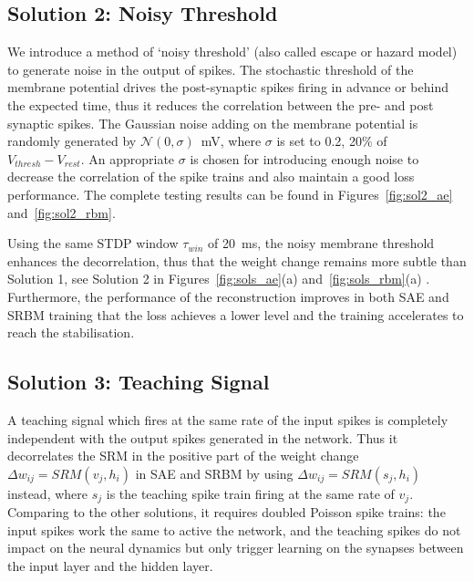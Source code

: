 \subsection{Solution 2: Noisy Threshold}
We introduce a method of `noisy threshold' (also called escape or hazard model)~\cite{gerstner2002spiking} to generate noise in the output of spikes.
The stochastic threshold of the membrane potential drives the post-synaptic spikes firing in advance or behind the expected time, thus it reduces the correlation between the pre- and post synaptic spikes.
The Gaussian noise adding on the membrane potential is randomly generated by $\mathcal{N}(0, \sigma)$~mV, where $\sigma$ is set to 0.2, 20\% of $V_{thresh} - V_{rest}.$
An appropriate $\sigma$ is chosen for introducing enough noise to decrease the correlation of the spike trains and also maintain a good loss performance.
The complete testing results can be found in Figures~\ref{fig:sol2_ae} and~\ref{fig:sol2_rbm}.

Using the same STDP window $\tau_{win}$ of 20~ms, the noisy membrane threshold enhances the decorrelation, thus that the weight change remains more subtle than Solution 1, see Solution 2 in Figures~\ref{fig:sols_ae}(a) and~\ref{fig:sols_rbm}(a) .
Furthermore, the performance of the reconstruction improves in both SAE and SRBM training that the loss achieves a lower level and the training accelerates to reach the stabilisation. %


\subsection{Solution 3: Teaching Signal}
A teaching signal which fires at the same rate of the input spikes is completely independent with the output spikes generated in the network.
Thus it decorrelates the SRM in the positive part of the weight change $\Delta w_{ij} = SRM(v_j,h_i)$ in SAE and SRBM by using $\Delta w_{ij}=SRM(s_j,h_i)$ instead, where $s_j$ is the teaching spike train firing at the same rate of $v_j$.
Comparing to the other solutions, it requires doubled Poisson spike trains: the input spikes work the same to active the network, and the teaching spikes do not impact on the neural dynamics but only trigger learning on the synapses between the input layer and the hidden layer.

